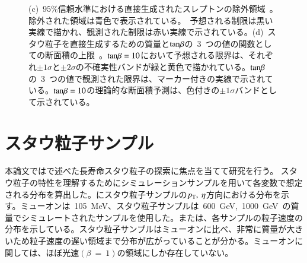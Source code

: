 \begin{figure}[H]
{    (c)~$95\%$信頼水準における直接生成されたスレプトンの除外領域~\cite{AR:03}。除外された領域は青色で表示されている。~予想される制限は黒い実線で描かれ、観測された制限は赤い実線で示されている。(d)~スタウ粒子を直接生成するための質量と$\rm{tan}\beta$の~3~つの値の関数としての断面積の上限~\cite{AR:03}。$\rm{tan}\beta=10$において予想される限界は、それぞれ$\pm1\sigma$と$\pm2\sigma$の不確実性バンドが緑と黄色で描かれている。$\rm{tan}\beta$の~3~つの値で観測された限界は、マーカー付きの実線で示されている。$\rm{tan}\beta=10$の理論的な断面積予測は、色付きの$\pm1\sigma$バンドとして示されている。}\label{fig:stau1}
\end{figure}

\section{スタウ粒子サンプル}
本論文ではで述べた長寿命スタウ粒子の探索に焦点を当てて研究を行う。
スタウ粒子の特性を理解するためにシミュレーションサンプルを用いて各変数で想定される分布を算出した。にスタウ粒子サンプルの$p_{\rm{T}},~\eta$方向における分布を示す。ミューオンは~105~MeV、スタウ粒子サンプルは~600~GeV,~1000~GeV~の質量でシミュレートされたサンプルを使用した。または、各サンプルの粒子速度の分布を示している。スタウ粒子サンプルはミューオンに比べ、非常に質量が大きいため粒子速度の遅い領域まで分布が広がっていることが分かる。ミューオンに関しては、ほぼ光速$\left(\beta~=~1\right)$の領域にしか存在していない。

